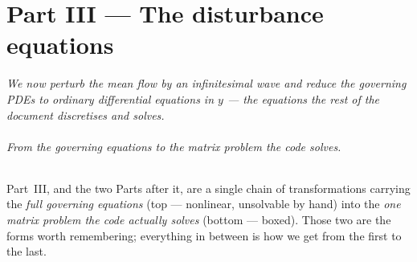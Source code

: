 \documentclass[11pt]{article}
\newcommand{\bridge}[1]{\par\noindent\textit{#1}\par\medskip}
\begin{document}
\part*{Part III --- The disturbance equations}
\bridge{We now perturb the mean flow by an infinitesimal wave and reduce the governing PDEs to ordinary
differential equations in $y$ --- the equations the rest of the document discretises and solves.}

\paragraph{From the governing equations to the matrix problem the code solves.} Part~III, and the two
Parts after it, are a single chain of transformations carrying the \emph{full governing equations} (top ---
nonlinear, unsolvable by hand) into the \emph{one matrix problem the code actually solves} (bottom ---
boxed). Those two are the forms worth remembering; everything in between is how we get from the first to the
last.
\end{document}
